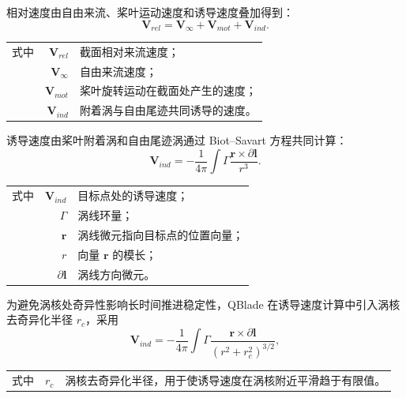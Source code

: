 相对速度由自由来流、桨叶运动速度和诱导速度叠加得到：
\begin{equation}
\mathbf{V}_{rel} = \mathbf{V}_{\infty} + \mathbf{V}_{mot} + \mathbf{V}_{ind}.
\end{equation}
\noindent
\begin{tabularx}{\textwidth}{@{}l@{\quad}r@{———}X@{}}
式中 & $\mathbf{V}_{rel}$      & 截面相对来流速度；\\
     & $\mathbf{V}_{\infty}$   & 自由来流速度；\\
     & $\mathbf{V}_{mot}$      & 桨叶旋转运动在截面处产生的速度；\\
     & $\mathbf{V}_{ind}$      & 附着涡与自由尾迹共同诱导的速度。\\
\end{tabularx}\vspace{3.15bp}

诱导速度由桨叶附着涡和自由尾迹涡通过 Biot--Savart 方程共同计算：
\begin{equation}
\mathbf{V}_{ind} =
-\frac{1}{4\pi}\int\Gamma
\frac{\mathbf{r}\times\partial\mathbf{l}}{r^3}.
\end{equation}
\noindent
\begin{tabularx}{\textwidth}{@{}l@{\quad}r@{———}X@{}}
式中 & $\mathbf{V}_{ind}$       & 目标点处的诱导速度；\\
     & $\Gamma$                 & 涡线环量；\\
     & $\mathbf{r}$             & 涡线微元指向目标点的位置向量；\\
     & $r$                      & 向量 $\mathbf{r}$ 的模长；\\
     & $\partial\mathbf{l}$     & 涡线方向微元。\\
\end{tabularx}\vspace{3.15bp}

为避免涡核处奇异性影响长时间推进稳定性，QBlade 在诱导速度计算中引入涡核去奇异化半径 $r_c$，采用
\begin{equation}
\mathbf{V}_{ind} =
-\frac{1}{4\pi}\int \Gamma
\frac{\mathbf{r}\times \partial\mathbf{l}}{(r^2+r_c^2)^{3/2}},
\label{eq:desingularized_biot_savart}
\end{equation}
\noindent
\begin{tabularx}{\textwidth}{@{}l@{\quad}r@{———}X@{}}
式中 & $r_c$ & 涡核去奇异化半径，用于使诱导速度在涡核附近平滑趋于有限值。\\
\end{tabularx}\vspace{3.15bp}

